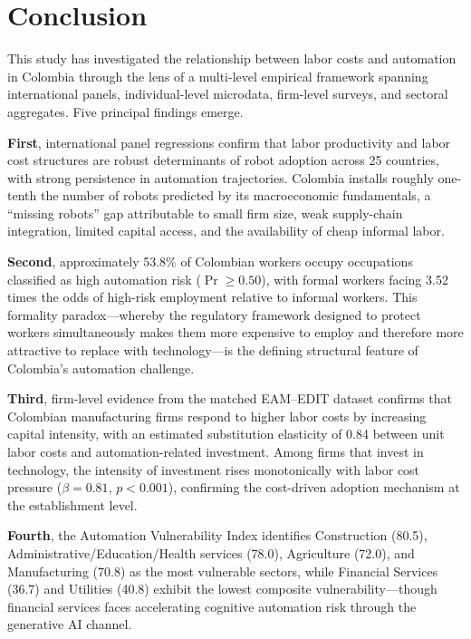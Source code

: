 \section{Conclusion}
\label{sec:conclusion}

This study has investigated the relationship between labor costs and automation in Colombia through the lens of a multi-level empirical framework spanning international panels, individual-level microdata, firm-level surveys, and sectoral aggregates. Five principal findings emerge.

\textbf{First}, international panel regressions confirm that labor productivity and labor cost structures are robust determinants of robot adoption across 25 countries, with strong persistence in automation trajectories. Colombia installs roughly one-tenth the number of robots predicted by its macroeconomic fundamentals, a ``missing robots'' gap attributable to small firm size, weak supply-chain integration, limited capital access, and the availability of cheap informal labor.

\textbf{Second}, approximately 53.8\% of Colombian workers occupy occupations classified as high automation risk ($\Pr \geq 0.50$), with formal workers facing 3.52 times the odds of high-risk employment relative to informal workers. This formality paradox---whereby the regulatory framework designed to protect workers simultaneously makes them more expensive to employ and therefore more attractive to replace with technology---is the defining structural feature of Colombia's automation challenge.

\textbf{Third}, firm-level evidence from the matched EAM--EDIT dataset confirms that Colombian manufacturing firms respond to higher labor costs by increasing capital intensity, with an estimated substitution elasticity of 0.84 between unit labor costs and automation-related investment. Among firms that invest in technology, the intensity of investment rises monotonically with labor cost pressure ($\beta = 0.81$, $p < 0.001$), confirming the cost-driven adoption mechanism at the establishment level.

\textbf{Fourth}, the Automation Vulnerability Index identifies Construction (80.5), Administrative/Education/Health services (78.0), Agriculture (72.0), and Manufacturing (70.8) as the most vulnerable sectors, while Financial Services (36.7) and Utilities (40.8) exhibit the lowest composite vulnerability---though financial services faces accelerating cognitive automation risk through the generative AI channel.

